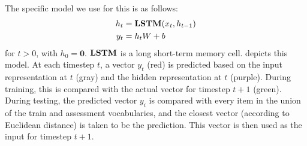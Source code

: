 The specific model we use for this is as follows:
%
\begin{align}
  h_{t} &= \textbf{LSTM}(x_{t}, h_{t-1}) \label{eq:lstm-recur-supp}\\
  y_{t} &= h_{t}W + b\label{eq:lstm-predict-supp}
\end{align}
%
for $t > 0$, with $h_{0} = \mathbf{0}$. $\textbf{LSTM}$ is a long short-term memory cell.  depicts this model. At each timestep $t$, a vector $y_{t}$ (red) is predicted based on the input representation at $t$ (gray) and the hidden representation at $t$ (purple). During training, this is compared with the actual vector for timestep $t+1$ (green). During testing, the predicted vector $y_{i}$ is compared with every item in the union of the train and assessment vocabularies, and the closest vector (according to Euclidean distance) is taken to be the prediction. This vector is then used as the input for timestep $t+1$.

